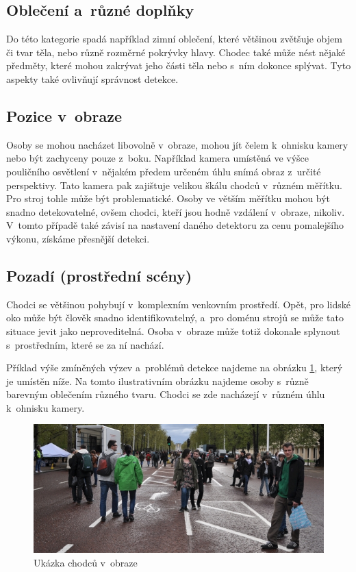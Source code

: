 \subsection{Oblečení a~různé doplňky}
Do této kategorie spadá například zimní oblečení, které většinou zvětšuje objem či tvar těla, nebo různě rozměrné pokrývky hlavy. Chodec také může nést nějaké předměty, které mohou zakrývat jeho části těla nebo s~ním dokonce splývat. Tyto aspekty také ovlivňují správnost detekce.

\subsection{Pozice v~obraze}
Osoby se mohou nacházet libovolně v~obraze, mohou jít čelem k~ohnisku kamery nebo být zachyceny pouze z~boku. Například kamera umístěná ve výšce pouličního osvětlení v~nějakém předem určeném úhlu snímá obraz z~určité perspektivy. Tato kamera pak zajištuje velikou škálu chodců v~různém měřítku. Pro stroj tohle může být problematické. Osoby ve větším měřítku mohou být snadno detekovatelné, ovšem chodci, kteří jsou hodně vzdálení v~obraze, nikoliv. V~tomto případě také závisí na nastavení daného detektoru za cenu pomalejšího výkonu, získáme přesnější detekci. 

\subsection{Pozadí (prostřední scény)}
Chodci se většinou pohybují v~komplexním venkovním prostředí. Opět, pro lidské oko může být člověk snadno identifikovatelný, a~pro doménu strojů se může tato situace jevit jako neproveditelná. Osoba v~obraze může totiž dokonale splynout s~prostředním, které se za ní nachází.  

Příklad výše zmíněných výzev a~problémů detekce najdeme na obrázku \ref{pedestrians}, který je umístěn níže. Na tomto ilustrativním obrázku najdeme osoby s~různě barevným oblečením různého tvaru. Chodci se zde nacházejí v~různém úhlu k~ohnisku kamery. 

\begin{figure}[H]
\centering
\includegraphics[width=15cm]{figures/pedestrians}
\caption{Ukázka chodců v~obraze}
\label{pedestrians}
\end{figure}